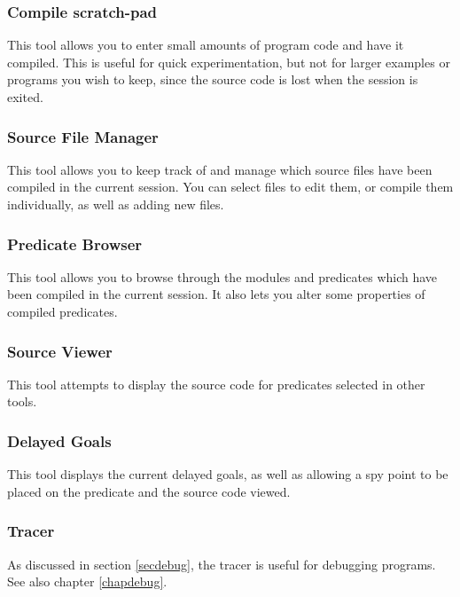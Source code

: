 \subsubsection{Compile scratch-pad}

This tool allows you to enter small amounts of program code and have it
compiled.
This is useful for quick experimentation, but not for larger examples or
programs you wish to keep, since the source code is lost when the session is
exited.

\subsubsection{Source File Manager}

This tool allows you to keep track of and manage which source files have
been compiled in the current {\eclipse} session.
You can select files to edit them, or compile them individually, as well as
adding new files.

\subsubsection{Predicate Browser}

This tool allows you to browse through the modules and predicates which have
been compiled in the current session.
It also lets you alter some properties of compiled predicates.

\subsubsection{Source Viewer}

This tool attempts to display the source code for predicates selected in
other tools.

\subsubsection{Delayed Goals}

This tool displays the current delayed goals, as well as allowing a spy
point to be placed on the predicate and the source code viewed.

\subsubsection{Tracer}

As discussed in section \ref{secdebug}, the tracer is useful for debugging
programs.
See also chapter \ref{chapdebug}.

